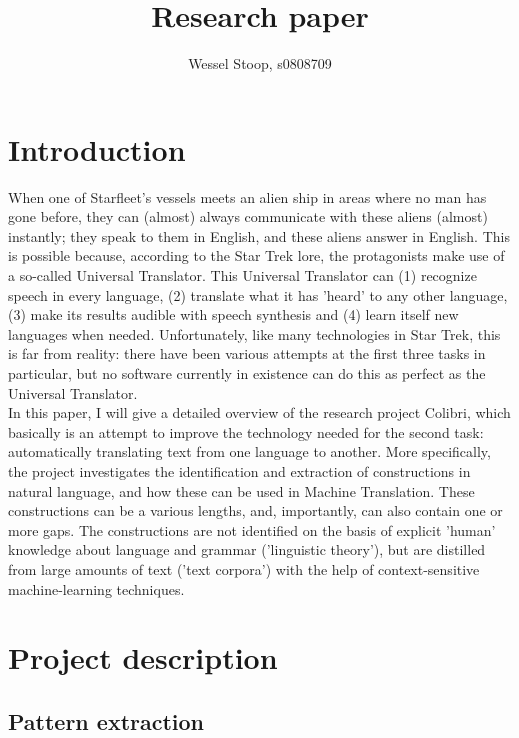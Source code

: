 \documentclass[12pt]{article}
\title{Research paper}
\author{Wessel Stoop, s0808709}
\begin{document}
\maketitle

\section{Introduction}

When one of Starfleet's vessels meets an alien ship in areas where no man has gone before, they can (almost) always communicate with these aliens (almost) instantly; they speak to them in English, and these aliens answer in English. This is possible because, according to the Star Trek lore, the protagonists make use of a so-called Universal Translator. This Universal Translator can (1) recognize speech in every language, (2) translate what it has 'heard' to any other language, (3) make its results audible with speech synthesis and (4) learn itself new languages when needed. Unfortunately, like many technologies in Star Trek, this is far from reality: there have been various attempts at the first three tasks in particular, but no software currently in existence can do this as perfect as the Universal Translator. \\\indent
In this paper, I will give a detailed overview of the research project Colibri, which basically is an attempt to improve the technology needed for the second task: automatically translating text from one language to another. More specifically, the project investigates the identification and extraction of constructions in natural language, and how these can be used in Machine Translation. These constructions can be a various lengths, and, importantly, can also contain one or more gaps. The constructions are not identified on the basis of explicit 'human' knowledge about language and grammar ('linguistic theory'), but are distilled from large amounts of text ('text corpora') with the help of context-sensitive machine-learning techniques. 




\section{Project description}


\subsection{Pattern extraction}
\end{document}
